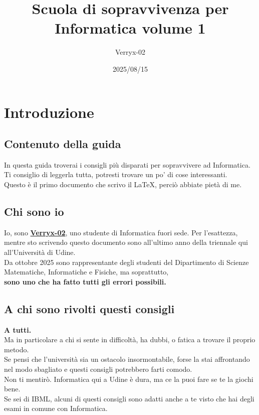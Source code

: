 \documentclass{article}
\title{Scuola di sopravvivenza per Informatica volume 1}
\author{Verryx-02}
\date{2025/08/15}
\begin{document}
\maketitle

\tableofcontents
\newpage

\section{Introduzione}

\subsection{Contenuto della guida}
In questa guida troverai i consigli più disparati per sopravvivere ad Informatica. Ti consiglio di leggerla tutta, potresti trovare un po' di cose interessanti.\\
Questo è il primo documento che scrivo il \LaTeX, perciò abbiate pietà di me.

\subsection{Chi sono io}
Io, sono \href{https://github.com/Verryx-02}{\textbf{Verryx-02}}, uno studente di Informatica fuori sede. 
Per l'esattezza, mentre sto scrivendo questo documento sono all'ultimo anno della triennale qui all'Università di Udine.\\
Da ottobre 2025 sono rappresentante degli studenti del Dipartimento di Scienze Matematiche, Informatiche e Fisiche, ma soprattutto,\\
\textbf{sono uno che ha fatto tutti gli errori possibili.}


\subsection{A chi sono rivolti questi consigli}
\textbf{A tutti.}\\
Ma in particolare a chi si sente in difficoltà, ha dubbi, o fatica a trovare il proprio metodo.\\
Se pensi che l'università sia un ostacolo insormontabile, forse la stai affrontando nel modo sbagliato e questi consigli potrebbero farti comodo.\\
Non ti mentirò. Informatica qui a Udine è dura, ma ce la puoi fare se te la giochi bene.\\
Se sei di IBML, alcuni di questi consigli sono adatti anche a te visto che hai degli esami in comune con Informatica. 
\end{document}
